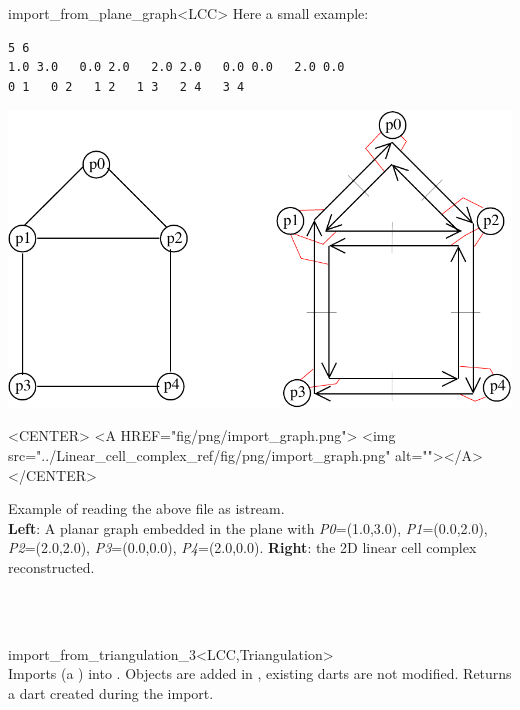 \begin{ccRefFunction}{import_from_plane_graph<LCC>}
Here a small example:
\begin{verbatim}
5 6
1.0 3.0   0.0 2.0   2.0 2.0   0.0 0.0   2.0 0.0
0 1   0 2   1 2   1 3   2 4   3 4
\end{verbatim}
%
\def\LargFig{.5\textwidth}
  \begin{ccTexOnly}
    \begin{center}
      \includegraphics[width=\LargFig]{Linear_cell_complex_ref/fig/pdf/import_graph}
    \end{center}
  \end{ccTexOnly}
  \begin{ccHtmlOnly}
    <CENTER>
    <A HREF="fig/png/import_graph.png">
        <img src="../Linear_cell_complex_ref/fig/png/import_graph.png" alt=""></A>
    </CENTER>
    \end{ccHtmlOnly}
    \begin{center}
      Example of  reading the above file as istream. \\
      \textbf{Left}: A planar graph embedded in the plane with 
      \emph{P0}=(1.0,3.0), \emph{P1}=(0.0,2.0), \emph{P2}=(2.0,2.0), \emph{P3}=(0.0,0.0), \emph{P4}=(2.0,0.0).
      \textbf{Right}: the 2D linear cell complex reconstructed.
      \end{center}
\ccSeeAlso
{}\\
\\
\end{ccRefFunction}
\begin{ccRefFunction}{import_from_triangulation_3<LCC,Triangulation>}
\\

 {Imports  (a ) into . 
   Objects are added in , existing darts are not modified.
   Returns a dart created during the import.
 }
\ccSeeAlso
{}\\
\\
\end{ccRefFunction}
